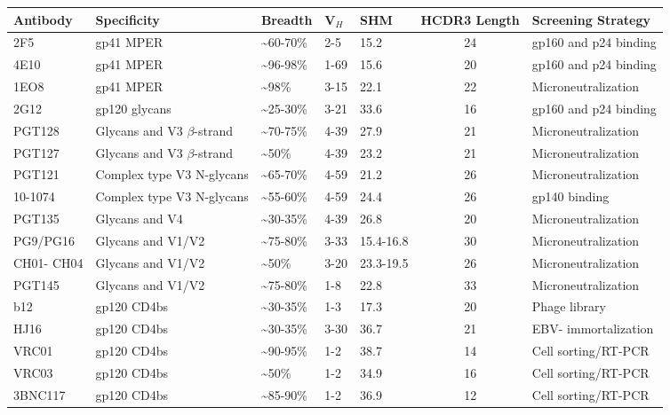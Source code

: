 \begin{sidewaystable}[htbp]
  \centering
\begin{tabular}{lllllcl}
\toprule
Antibody & Specificity & Breadth & V$_{H}$ & SHM & HCDR3 Length & Screening Strategy \\ 
\midrule
	2F5 & gp41 MPER & \textasciitilde60-70\% & 2-5 & 15.2 & 24 & gp160 and p24 binding \\
	4E10 & gp41 MPER & \textasciitilde96-98\% & 1-69 & 15.6 & 20 & gp160 and p24 binding   \\ 
	1EO8 & gp41 MPER & \textasciitilde98\% & 3-15 & 22.1 & 22 & Microneutralization  \\ 
	2G12 & gp120 glycans & \textasciitilde25-30\% & 3-21 & 33.6 & 16 & gp160 and p24 binding   \\ 
	PGT128 & Glycans and V3 $\beta$-strand & \textasciitilde70-75\% & 4-39 & 27.9 & 21 & Microneutralization  \\ 
	PGT127 & Glycans and V3 $\beta$-strand & \textasciitilde50\% & 4-39 & 23.2 & 21 & Microneutralization   \\ 
	PGT121 & Complex type V3 N-glycans & \textasciitilde65-70\% & 4-59 & 21.2 & 26 & Microneutralization  \\ 
	10-1074 & Complex type V3 N-glycans & \textasciitilde55-60\% & 4-59 & 24.4 & 26 & gp140 binding   \\ 
	PGT135 & Glycans and V4 & \textasciitilde30-35\% & 4-39 & 26.8 & 20 & Microneutralization   \\ 
	PG9/PG16 & Glycans and V1/V2 & \textasciitilde75-80\% & 3-33 & 15.4-16.8 & 30 & Microneutralization   \\ 
	CH01- CH04 & Glycans and V1/V2 & \textasciitilde50\% & 3-20 & 23.3-19.5 & 26 & Microneutralization  \\
	PGT145 & Glycans and V1/V2 & \textasciitilde75-80\% & 1-8 & 22.8 & 33 & Microneutralization \\
	b12 & gp120 CD4bs & \textasciitilde30-35\% & 1-3 & 17.3 & 20 & Phage library  \\ 
	HJ16 & gp120 CD4bs & \textasciitilde30-35\% & 3-30 & 36.7 & 21 & EBV- immortalization  \\ 
	VRC01 & gp120 CD4bs & \textasciitilde90-95\% & 1-2 & 38.7 & 14 & Cell sorting/RT-PCR \\
	VRC03 & gp120 CD4bs & \textasciitilde50\% & 1-2 & 34.9 & 16 & Cell sorting/RT-PCR \\ 
	3BNC117 & gp120 CD4bs & \textasciitilde85-90\% & 1-2 & 36.9 & 12 & Cell sorting/RT-PCR  \\ 

\end{tabular}
\end{sidewaystable}
